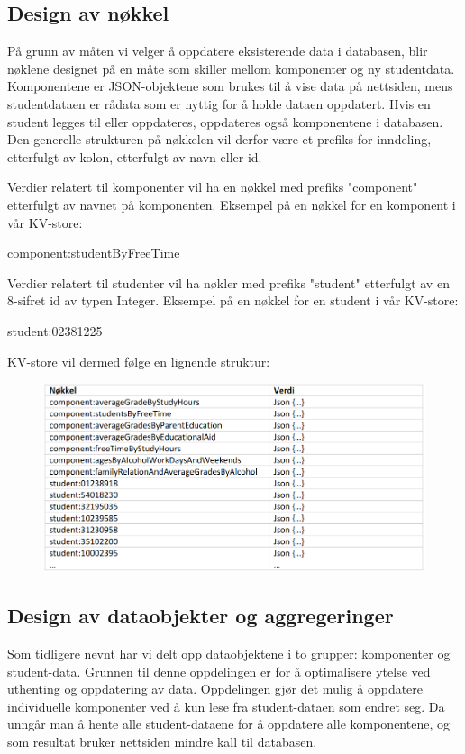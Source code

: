 \subsection{Design av nøkkel}
På grunn av måten vi velger å oppdatere eksisterende data i databasen, blir nøklene designet på en måte som skiller mellom komponenter og ny studentdata. Komponentene er JSON-objektene som brukes til å vise data på nettsiden, mens studentdataen er rådata som er nyttig for å holde dataen oppdatert. Hvis en student legges til eller oppdateres, oppdateres også komponentene i databasen. Den generelle strukturen på nøkkelen vil derfor være et prefiks for inndeling, etterfulgt av kolon, etterfulgt av navn eller id.

Verdier relatert til komponenter vil ha en nøkkel med prefiks "component" etterfulgt av navnet på komponenten. Eksempel på en nøkkel for en komponent i vår KV-store:

  component:studentByFreeTime


Verdier relatert til studenter vil ha nøkler med prefiks "student" etterfulgt av en 8-sifret id av typen Integer. Eksempel på en nøkkel for en student i vår KV-store:

  student:02381225

KV-store vil dermed følge en lignende struktur:


\begin{figure}[H]
  \includegraphics[width=\textwidth]{images/milepael2/tabellKVStore.png}
\end{figure}

\subsection{Design av dataobjekter og aggregeringer}
Som tidligere nevnt har vi delt opp dataobjektene i to grupper: komponenter og student-data. Grunnen til denne oppdelingen er for å optimalisere ytelse ved uthenting og oppdatering av data. Oppdelingen gjør det mulig å oppdatere individuelle komponenter ved å kun lese fra student-dataen som endret seg. Da unngår man å hente alle student-dataene for å oppdatere alle komponentene, og som resultat bruker nettsiden mindre kall til databasen.

